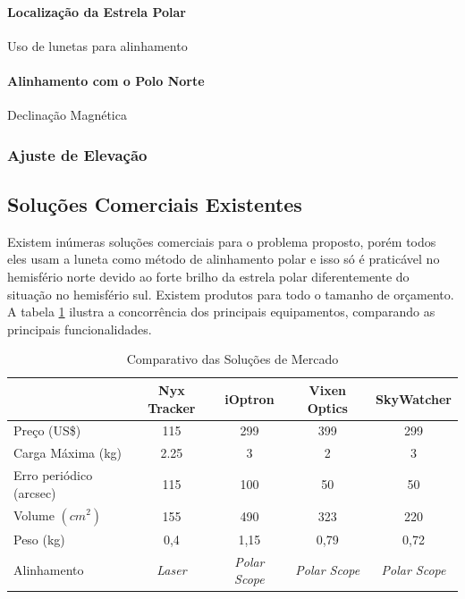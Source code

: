 \paragraph{Localização da Estrela Polar}
Uso de lunetas para alinhamento

\paragraph{Alinhamento com o Polo Norte}
Declinação Magnética

\subsubsection{Ajuste de Elevação}


\subsection{Soluções Comerciais Existentes}

Existem inúmeras soluções comerciais para o problema proposto, porém todos eles usam a luneta como método de alinhamento polar e isso só é praticável no hemisfério norte devido ao forte brilho da estrela polar diferentemente do situação no hemisfério sul. Existem produtos para todo o tamanho de orçamento. A tabela \ref{tabela_benchmark} ilustra a concorrência dos principais equipamentos, comparando as principais funcionalidades. 

\begin{table}[htb]
	\caption{Comparativo das Soluções de Mercado}
	\begin{tabular}{l|cccc}
		& Nyx Tracker & iOptron & Vixen Optics & SkyWatcher \\ \hline
		Preço (US\$) & 115 & 299 & 399 & 299 \\\hline
		Carga Máxima (kg) & 2.25 & 3 & 2 & 3 \\\hline
		Erro periódico (arcsec) & 115 & 100 & 50 & 50 \\\hline
		Volume $ (cm^2) $ & 155 & 490 & 323 & 220 \\\hline
		Peso (kg) & 0,4 & 1,15 & 0,79 & 0,72 \\\hline
		Alinhamento & \textit{Laser} & \textit{Polar Scope} & \textit{Polar Scope} & \textit{Polar Scope} \\
	\end{tabular}
	\label{tabela_benchmark}
\end{table}

